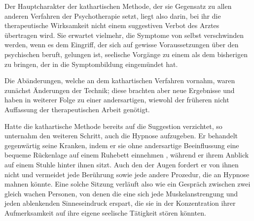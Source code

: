 \documentclass[twoside=true,titlepage=false,open=any, parskip=never, fontsize=10pt, headings=small, chapterprefix=false, appendixprefix=false]{scrbook}
\begin{document}
            
        \pstart
        Der Hauptcharakter der kathartischen Methode, der sie  Gegensatz zu allen anderen Verfahren der Psychotherapie setzt, liegt
               also darin,  bei ihr die therapeutische Wirksamkeit nicht einem suggestiven Verbot des
               Arztes übertragen wird. Sie erwartet vielmehr,  die Symptome von selbst verschwinden werden, wenn es dem Eingriff, der
               sich auf gewisse Voraussetzungen über den psychischen  beruft, gelungen ist, seelische Vorgänge zu einem  als dem bisherigen  zu bringen, der in die Symptombildung eingemündet hat.
        \pend
    
            
        \pstart
        Die Abänderungen, welche  an dem kathartischen
                  Verfahren  vornahm, waren zunächst Änderungen der Technik; diese brachten
               aber neue Ergebnisse und haben in weiterer Folge zu einer andersartigen, wiewohl
               der früheren nicht  Auffassung der therapeutischen Arbeit genötigt.
        \pend
    
            
        \pstart
        Hatte die kathartische Methode bereits auf die Suggestion verzichtet, so unternahm  den weiteren Schritt, auch die Hypnose aufzugeben. Er behandelt
                  gegenwärtig seine Kranken, indem er sie ohne andersartige Beeinflussung eine bequeme Rückenlage auf
               einem Ruhebett einnehmen , während er
                ihrem Anblick  auf einem Stuhle hinter ihnen sitzt. Auch den  der Augen fordert er von ihnen nicht und vermeidet jede Berührung sowie
               jede andere Prozedur, die an Hypnose mahnen könnte. Eine solche Sitzung verläuft
               also wie ein Gespräch zwischen zwei gleich wachen Personen, von denen die
               eine sich jede Muskelanstrengung und jeden ablenkenden Sinneseindruck
               erspart, die sie in der Konzentration ihrer Aufmerksamkeit auf ihre eigene
               seelische Tätigkeit stören könnten.
        \pend
    
\end{document}
